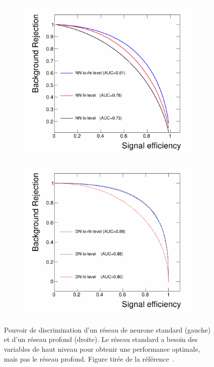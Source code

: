 \begin{figure}[h]
  \centering
  \begin{subfigure}{.5\textwidth}
    \includegraphics[width=\textwidth]{deep_a.pdf}
    \label{fig:sub1}
  \end{subfigure}%
  \begin{subfigure}{.5\textwidth}
    \includegraphics[width=\textwidth]{deep_b.pdf}
    \label{fig:sub2}
  \end{subfigure}
  \caption{Pouvoir de discrimination d'un réseau de neurone standard
    (gauche) et d'un réseau profond (droite). Le réseau standard a besoin des variables de haut niveau pour obtenir une performance optimale, mais pas le réseau profond. Figure tirée de la
référence~\cite{baldi_searching_2014}.}
  \label{fig:deep}
\end{figure}



